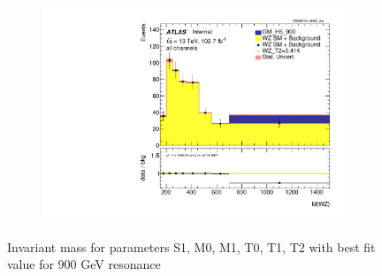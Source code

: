 \documentclass[../Bachelorarbeit.tex]{subfiles}
\begin{document}
\begin{figure}[h]
\begin{subfigure}{0.45\textwidth}
    \end{subfigure}
    \begin{subfigure}{0.45\textwidth}
        \includegraphics[width=\textwidth]{Plots/ALL_MWZ_right_color/GM_H5_900/T2/2022-05-07/VBSSR/all_VV_MWZ_vbs.pdf}
    \end{subfigure}

    \caption{Invariant mass for parameters S1, M0, M1, T0, T1, T2 with best fit value for 900 GeV resonance}
    \label{fig:all_mwz_900}
\end{figure}
\end{document}
